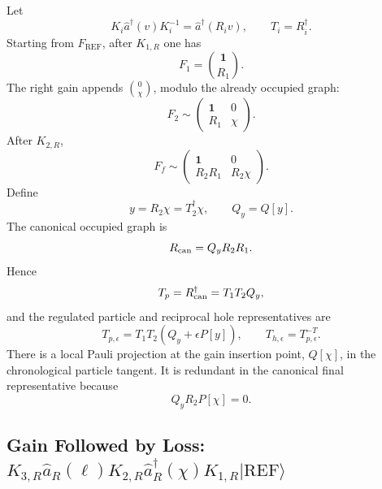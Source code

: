 \documentclass[aps,prb,onecolumn,nofootinbib,superscriptaddress]{revtex4-2}
\newcommand{\Id}{\mathbf{1}}
\newcommand{\REF}{\mathrm{REF}}
\newcommand{\ket}[1]{\lvert #1\rangle}
\newcommand{\ahat}{\hat a}
\newcommand{\eps}{\epsilon}
\begin{document}
Let
\begin{equation}
  K_i\ahat^\dagger(v)K_i^{-1}=\ahat^\dagger(R_i v),
  \qquad
  T_i=R_i^\dagger .
\end{equation}
Starting from \(F_{\REF}\), after \(K_{1,R}\) one has
\begin{equation}
  F_1=\binom{\Id}{R_1}.
\end{equation}
The right gain appends \(\binom{0}{\chi}\), modulo the already occupied graph:
\begin{equation}
  F_2\sim
  \begin{pmatrix}
    \Id & 0\\
    R_1 & \chi
  \end{pmatrix}.
\end{equation}
After \(K_{2,R}\),
\begin{equation}
  F_f\sim
  \begin{pmatrix}
    \Id & 0\\
    R_2R_1 & R_2\chi
  \end{pmatrix}.
\end{equation}
Define
\begin{equation}
  y=R_2\chi=T_2^\dagger\chi,\qquad Q_y=Q[y].
\end{equation}
The canonical occupied graph is
\begin{equation}
  R_{\rm can}=Q_yR_2R_1.
\end{equation}
Hence
\begin{equation}
  T_p=R_{\rm can}^\dagger=T_1T_2Q_y,
\end{equation}
and the regulated particle and reciprocal hole representatives are
\begin{equation}
  T_{p,\eps}=T_1T_2(Q_y+\eps P[y]),
  \qquad
  T_{h,\eps}=T_{p,\eps}^{-T}.
  \label{eq:single-gain-regulated}
\end{equation}
There is a local Pauli projection at the gain insertion point,
\(Q[\chi]\), in the chronological particle tangent.  It is redundant in the
canonical final representative because
\begin{equation}
  Q_yR_2P[\chi]=0.
\end{equation}

\subsection{\texorpdfstring{Gain Followed by Loss: \(K_{3,R}\ahat_R(\ell)K_{2,R}\ahat_R^\dagger(\chi)K_{1,R}\ket{\REF}\)}{Gain Followed by Loss}}
\end{document}
